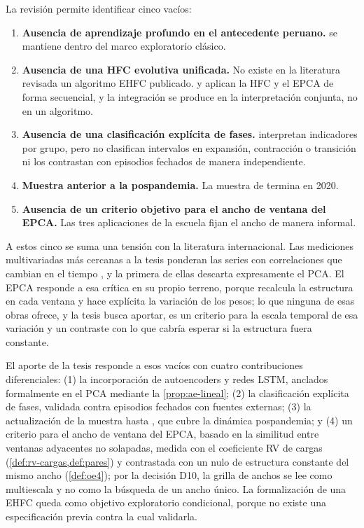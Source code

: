 La revisión permite identificar cinco vacíos:

\begin{enumerate}[leftmargin=*]
  \item \textbf{Ausencia de aprendizaje profundo en el antecedente peruano.}
    \textcite{camiz_cerda_atoche_2026} se mantiene dentro del marco exploratorio clásico.
  \item \textbf{Ausencia de una HFC evolutiva unificada.} No existe en la literatura revisada un
    algoritmo EHFC publicado. \textcite{camiz_roig_2011} y \textcite{camiz_cerda_atoche_2026}
    aplican la HFC y el EPCA de forma secuencial, y la integración se produce en la interpretación
    conjunta, no en un algoritmo.
  \item \textbf{Ausencia de una clasificación explícita de fases.}
    \textcite{camiz_cerda_atoche_2026} interpretan indicadores por grupo, pero no clasifican
    intervalos en expansión, contracción o transición ni los contrastan con episodios fechados de
    manera independiente.
  \item \textbf{Muestra anterior a la pospandemia.} La muestra de
    \textcite{camiz_cerda_atoche_2026} termina en 2020.
  \item \textbf{Ausencia de un criterio objetivo para el ancho de ventana del EPCA.} Las tres
    aplicaciones de la escuela fijan el ancho de manera informal.
\end{enumerate}

A estos cinco se suma una tensión con la literatura internacional. Las mediciones multivariadas
más cercanas a la tesis ponderan las series con correlaciones que cambian en el tiempo
\parencite{schuler_hiebert_peltonen_2015,hollo_kremer_lo_duca_2012,brandao_marques_perez_ruiz_2017},
y la primera de ellas descarta expresamente el PCA. El EPCA responde a esa crítica en su propio
terreno, porque recalcula la estructura en cada ventana y hace explícita la variación de los
pesos; lo que ninguna de esas obras ofrece, y la tesis busca aportar, es un criterio para la
escala temporal de esa variación y un contraste con lo que cabría esperar si la estructura fuera
constante.

El aporte de la tesis responde a esos vacíos con cuatro contribuciones diferenciales: (1) la
incorporación de autoencoders y redes LSTM, anclados formalmente en el PCA mediante la
\cref{prop:ae-lineal}; (2) la clasificación explícita de fases, validada contra episodios fechados
con fuentes externas; (3) la actualización de la muestra hasta \fechaFinDatos{}, que cubre la
dinámica pospandemia; y (4) un criterio para el ancho de ventana del EPCA, basado en la
similitud entre ventanas adyacentes no solapadas, medida con el coeficiente RV de cargas
(\cref{def:rv-cargas,def:pares}) y contrastada con un nulo de estructura constante del mismo ancho
(\cref{def:oe4}); por la decisión D10, la grilla de anchos se lee como multiescala y no como la
búsqueda de un ancho único. La formalización de una EHFC queda como objetivo
exploratorio condicional, porque no existe una especificación previa contra la cual validarla.
